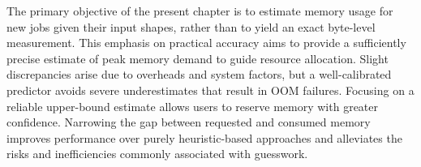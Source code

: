 The primary objective of the present chapter is to estimate memory usage for new jobs given their input shapes, rather than to yield an exact byte-level measurement.
This emphasis on practical accuracy aims to provide a sufficiently precise estimate of peak memory demand to guide resource allocation.
Slight discrepancies arise due to overheads and system factors, but a well-calibrated predictor avoids severe underestimates that result in \ac{OOM} failures.
Focusing on a reliable upper-bound estimate allows users to reserve memory with greater confidence.
Narrowing the gap between requested and consumed memory improves performance over purely heuristic-based approaches and alleviates the risks and inefficiencies commonly associated with guesswork.